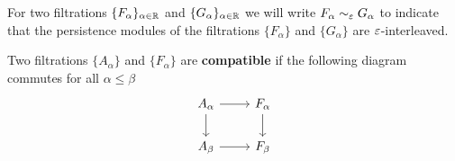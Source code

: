 
%

For two filtrations $\{F_\alpha\}_{\alpha\in\mathbb{R}}$ and $\{G_\alpha\}_{\alpha\in\mathbb{R}}$ we will write $F_\alpha\sim_\varepsilon G_\alpha$ to indicate that the persistence modules of the filtrations $\{F_\alpha\}$ and $\{G_\alpha\}$ are $\varepsilon$-interleaved.

\begin{definition}
  Two filtrations $\{A_\alpha\}$ and $\{F_\alpha\}$ are \textbf{compatible} if the following diagram commutes for all $\alpha\leq\beta$
  \begin{equation}\begin{tikzcd}
    A_\alpha\arrow{r}\arrow{d} &
    F_\alpha\arrow{d} \\
    A_\beta\arrow{r} &
    F_\beta
  \end{tikzcd}\end{equation}
\end{definition}


